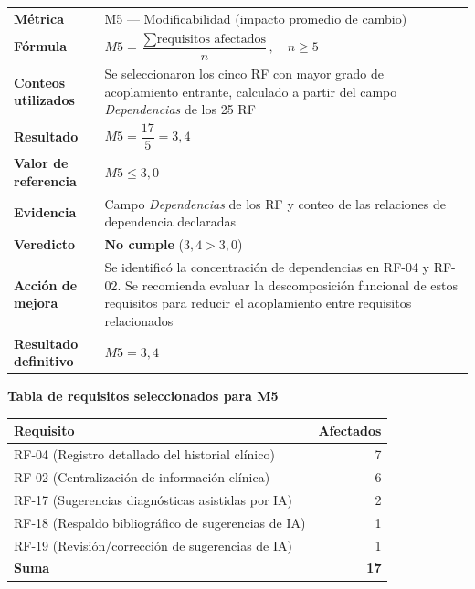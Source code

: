 \begin{tabular}{p{3.2cm}p{9.5cm}}
\hline
\textbf{Métrica} &
M5 — Modificabilidad (impacto promedio de cambio) \\

\textbf{Fórmula} &
$M5 =
\dfrac{\sum\text{requisitos afectados}}{n},
\quad n\geq5$ \\

\textbf{Conteos utilizados} &
Se seleccionaron los cinco RF con mayor grado de acoplamiento
entrante, calculado a partir del campo \emph{Dependencias} de
los 25 RF \\

\textbf{Resultado} &
$M5=\dfrac{17}{5}=3{,}4$ \\

\textbf{Valor de referencia} & $M5\leq3{,}0$ \\

\textbf{Evidencia} &
Campo \emph{Dependencias} de los RF y conteo de las relaciones
de dependencia declaradas \\

\textbf{Veredicto} & \textbf{No cumple} ($3{,}4>3{,}0$) \\

\textbf{Acción de mejora} &
Se identificó la concentración de dependencias en RF-04 y RF-02.
Se recomienda evaluar la descomposición funcional de estos requisitos
para reducir el acoplamiento entre requisitos relacionados \\

\textbf{Resultado definitivo} &
$M5=3{,}4$ \\

\hline
\end{tabular}

\vspace{0.3cm}

\noindent\textbf{Tabla de requisitos seleccionados para M5}

\begin{tabular}{lr}
\hline
\textbf{Requisito} & \textbf{Afectados} \\
\hline

RF-04 (Registro detallado del historial clínico) & 7 \\
RF-02 (Centralización de información clínica) & 6 \\
RF-17 (Sugerencias diagnósticas asistidas por IA) & 2 \\
RF-18 (Respaldo bibliográfico de sugerencias de IA) & 1 \\
RF-19 (Revisión/corrección de sugerencias de IA) & 1 \\

\hline
\textbf{Suma} & \textbf{17} \\
\hline
\end{tabular}

